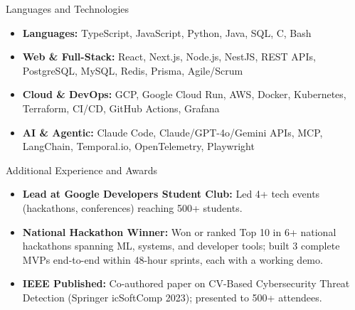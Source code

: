 \documentclass[]{mcdowellcv}
\begin{document}
\begin{cvsection}{Languages and Technologies}
  \begin{cvsubsection}{}{}{}
    \begin{itemize}
      \item \textbf{Languages:} TypeScript, JavaScript, Python, Java, SQL, C, Bash
      \item \textbf{Web \& Full-Stack:} React, Next.js, Node.js, NestJS, REST APIs, PostgreSQL, MySQL, Redis, Prisma, Agile/Scrum
      \item \textbf{Cloud \& DevOps:} GCP, Google Cloud Run, AWS, Docker, Kubernetes, Terraform, CI/CD, GitHub Actions, Grafana
      \item \textbf{AI \& Agentic:} Claude Code, Claude/GPT-4o/Gemini APIs, MCP, LangChain, Temporal.io, OpenTelemetry, Playwright
    \end{itemize}
  \end{cvsubsection}
\end{cvsection}

\begin{cvsection}{Additional Experience and Awards}
  \begin{cvsubsection}{}{}{}
    \begin{itemize}
      \item \textbf{Lead at Google Developers Student Club:} Led 4+ tech events (hackathons, conferences) reaching 500+ students.
      \item \textbf{National Hackathon Winner:} Won or ranked Top 10 in 6+ national hackathons spanning ML, systems, and developer tools; built 3 complete MVPs end-to-end within 48-hour sprints, each with a working demo.
      \item \textbf{IEEE Published:} Co-authored paper on CV-Based Cybersecurity Threat Detection (Springer icSoftComp 2023); presented to 500+ attendees.
    \end{itemize}
  \end{cvsubsection}
\end{cvsection}
\end{document}
